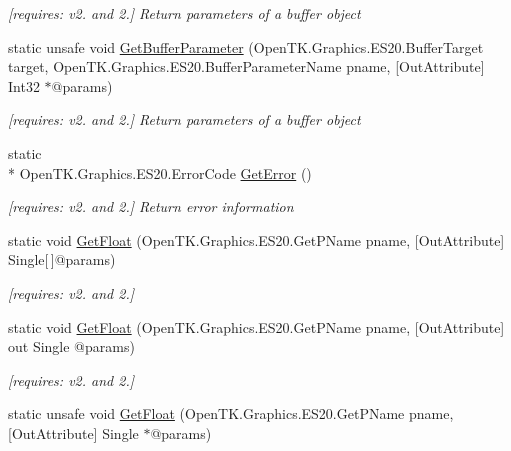 \begin{DoxyCompactItemize}
\begin{DoxyCompactList}\small\item\em \mbox{[}requires\-: v2. and 2.\mbox{]} Return parameters of a buffer object \end{DoxyCompactList}\item 
static unsafe void \hyperlink{class_open_t_k_1_1_graphics_1_1_e_s20_1_1_g_l_aa3ab3ab8895b4c191fefd68fc05b1cde}{Get\-Buffer\-Parameter} (Open\-T\-K.\-Graphics.\-E\-S20.\-Buffer\-Target target, Open\-T\-K.\-Graphics.\-E\-S20.\-Buffer\-Parameter\-Name pname, \mbox{[}Out\-Attribute\mbox{]} Int32 $\ast$@params)
\begin{DoxyCompactList}\small\item\em \mbox{[}requires\-: v2. and 2.\mbox{]} Return parameters of a buffer object \end{DoxyCompactList}\item 
static \\*
Open\-T\-K.\-Graphics.\-E\-S20.\-Error\-Code \hyperlink{class_open_t_k_1_1_graphics_1_1_e_s20_1_1_g_l_a6625124c640f048cd6a40e6f11cc85eb}{Get\-Error} ()
\begin{DoxyCompactList}\small\item\em \mbox{[}requires\-: v2. and 2.\mbox{]} Return error information \end{DoxyCompactList}\item 
static void \hyperlink{class_open_t_k_1_1_graphics_1_1_e_s20_1_1_g_l_a77a5f1c4adfaa7ca8fb17d7acb2b9dd3}{Get\-Float} (Open\-T\-K.\-Graphics.\-E\-S20.\-Get\-P\-Name pname, \mbox{[}Out\-Attribute\mbox{]} Single\mbox{[}$\,$\mbox{]}@params)
\begin{DoxyCompactList}\small\item\em \mbox{[}requires\-: v2. and 2.\mbox{]}\end{DoxyCompactList}\item 
static void \hyperlink{class_open_t_k_1_1_graphics_1_1_e_s20_1_1_g_l_a3e10607a70e66572c09f77916e306588}{Get\-Float} (Open\-T\-K.\-Graphics.\-E\-S20.\-Get\-P\-Name pname, \mbox{[}Out\-Attribute\mbox{]} out Single @params)
\begin{DoxyCompactList}\small\item\em \mbox{[}requires\-: v2. and 2.\mbox{]}\end{DoxyCompactList}\item 
static unsafe void \hyperlink{class_open_t_k_1_1_graphics_1_1_e_s20_1_1_g_l_a2215ba2409e8849f5a7a0f15701394ed}{Get\-Float} (Open\-T\-K.\-Graphics.\-E\-S20.\-Get\-P\-Name pname, \mbox{[}Out\-Attribute\mbox{]} Single $\ast$@params)

\end{DoxyCompactItemize}
